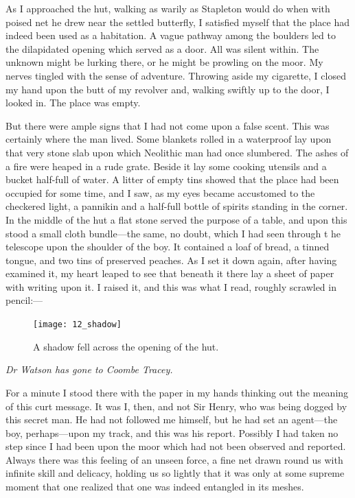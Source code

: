 \documentclass[paper=5.5in:8.5in,BCOR=7mm,twoside,DIV=calc,12pt,usegeometry,openany,chapterprefix,endperiod,headings=big]{scrbook} %
\begin{document}
As I approached the hut, walking as warily as Stapleton would do when with poised net he drew near the settled butterfly, I satisfied myself that the place had indeed been used as a habitation. A vague pathway among the boulders led to the dilapidated opening which served as a door. All was silent within. The unknown might be lurking there, or he might be prowling on the moor. My nerves tingled with the sense of adventure. Throwing aside my cigarette, I closed my hand upon the butt of my revolver and, walking swiftly up to the door, I looked in. The place was empty.

But there were ample signs that I had not come upon a false scent. This was certainly where the man lived. Some blankets rolled in a waterproof lay upon that very stone slab upon which Neolithic man had once slumbered. The ashes of a fire were heaped in a rude grate. Beside it lay some cooking utensils and a bucket half-full of water. A litter of empty tins showed that the place had been occupied for some time, and I saw, as my eyes became accustomed to the checkered light, a pannikin and a half-full bottle of spirits standing in the corner. In the middle of the hut a flat stone served the purpose of a table, and upon this stood a small cloth bundle---the same, no doubt, which I had seen through t
he telescope upon the shoulder of the boy. It contained a loaf of bread, a tinned tongue, and two tins of preserved peaches. As I set it down again, after having examined it, my heart leaped to see that beneath it there lay a sheet of paper with writing upon it. I raised it, and this was what I read, roughly scrawled in pencil:--- 

\begin{figure}[p]
\centering
\texttt{[image: 12\_shadow]}
\caption{A shadow fell across the opening of the hut.}
\end{figure}

\textit{Dr Watson has gone to Coombe Tracey.}

For a minute I stood there with the paper in my hands thinking out the meaning of this curt message. It was I, then, and not Sir Henry, who was being dogged by this secret man. He had not followed me himself, but he had set an agent---the boy, perhaps---upon my track, and this was his report. Possibly I had taken no step since I had been upon the moor which had not been observed and reported. Always there was this feeling of an unseen force, a fine net drawn round us with infinite skill and delicacy, holding us so lightly that it was only at some supreme moment that one realized that one was indeed entangled in its meshes.
\end{document}
